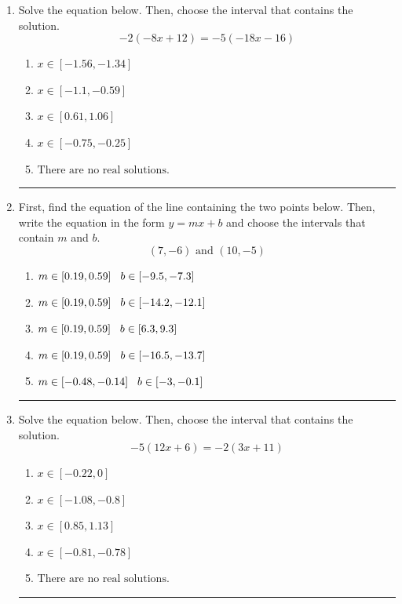 \documentclass[14pt]{extbook}
\newcommand{\litem}[1]{\item#1\hspace*{-1cm}\rule{\textwidth}{0.4pt}}
\begin{document}
\begin{enumerate}
{\begin{enumerate}[label=\Alph*.]
\end{enumerate} }
\litem{
Solve the equation below. Then, choose the interval that contains the solution.\[ -2(-8x + 12) = -5(-18x -16) \]\begin{enumerate}[label=\Alph*.]
\item \( x \in [-1.56, -1.34] \)
\item \( x \in [-1.1, -0.59] \)
\item \( x \in [0.61, 1.06] \)
\item \( x \in [-0.75, -0.25] \)
\item \( \text{There are no real solutions.} \)

\end{enumerate} }
\litem{
First, find the equation of the line containing the two points below. Then, write the equation in the form $ y=mx+b $ and choose the intervals that contain $m$ and $b$.\[ (7, -6) \text{ and } (10, -5) \]\begin{enumerate}[label=\Alph*.]
\item \( m \in [0.19, 0.59] \hspace*{3mm} b \in [-9.5, -7.3] \)
\item \( m \in [0.19, 0.59] \hspace*{3mm} b \in [-14.2, -12.1] \)
\item \( m \in [0.19, 0.59] \hspace*{3mm} b \in [6.3, 9.3] \)
\item \( m \in [0.19, 0.59] \hspace*{3mm} b \in [-16.5, -13.7] \)
\item \( m \in [-0.48, -0.14] \hspace*{3mm} b \in [-3, -0.1] \)

\end{enumerate} }
\litem{
Solve the equation below. Then, choose the interval that contains the solution.\[ -5(12x + 6) = -2(3x + 11) \]\begin{enumerate}[label=\Alph*.]
\item \( x \in [-0.22, 0] \)
\item \( x \in [-1.08, -0.8] \)
\item \( x \in [0.85, 1.13] \)
\item \( x \in [-0.81, -0.78] \)
\item \( \text{There are no real solutions.} \)


\end{enumerate}}
\end{enumerate}
\end{document}
